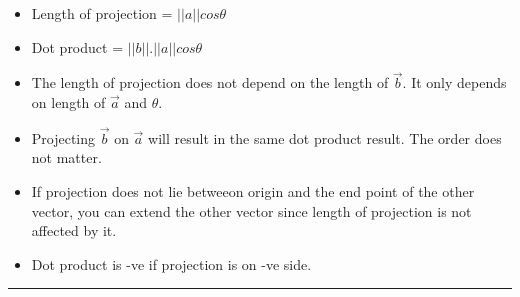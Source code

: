 \documentclass[	DIV=calc,%
paper=a4,%
fontsize=11pt,%
twocolumn]{scrartcl} %
\newcommand{\hformbar}[1]{\vspace{5pt}\hrule\vspace{10pt}} %
\newcommand{\formdesc}[1]{\noindent\textbf{#1}}
\begin{document}
\begin{itemize}
	\item Length of projection = $||a||cos\theta$
	\item Dot product = $||b||.||a|| cos\theta $
	\item The length of projection does not depend on the length of $\vec{b}$. It only depends on length of $\vec{a}$ and $\theta$.
	\item Projecting $\vec{b}$ on $\vec{a}$ will result in the same dot product result. The order does not matter.
	\item If projection does not lie betweeon origin and the end point of the other vector, you can extend the other vector since length of projection is not affected by it.
	\item Dot product is -ve if projection is on -ve side.
\end{itemize}

\hformbar
\formdesc{Cross Product:}
\end{document}
